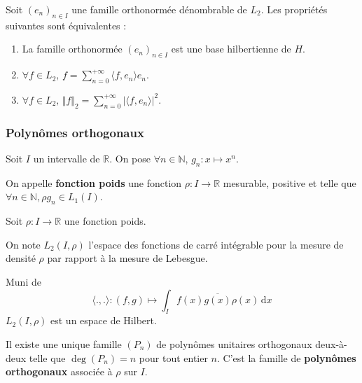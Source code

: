 	\begin{theorem}
		Soit $(e_n)_{n \in I}$ une famille orthonormée dénombrable de $L_2$. Les propriétés suivantes sont équivalentes :
		\begin{enumerate}[label=(\roman*)]
			\item La famille orthonormée $(e_n)_{n \in I}$ est une base hilbertienne de $H$.
			\item $\forall f \in L_2, \, f = \sum_{n=0}^{+\infty} \langle f, e_n \rangle e_n$.
			\item $\forall f \in L_2, \, \Vert f \Vert_2 = \sum_{n=0}^{+\infty} \vert \langle f, e_n \rangle \vert^2$.
		\end{enumerate}
	\end{theorem}

	\subsubsection{Polynômes orthogonaux}

	\reference{110}

	Soit $I$ un intervalle de $\mathbb{R}$. On pose $\forall n \in \mathbb{N}$, $g_n : x \mapsto x^n$.

	\begin{definition}
		On appelle \textbf{fonction poids} une fonction $\rho : I \rightarrow \mathbb{R}$ mesurable, positive et telle que $\forall n \in \mathbb{N}, \rho g_n \in L_1(I)$.
	\end{definition}

	Soit $\rho : I \rightarrow \mathbb{R}$ une fonction poids.

	\begin{notation}
		On note $L_2(I, \rho)$ l'espace des fonctions de carré intégrable pour la mesure de densité $\rho$ par rapport à la mesure de Lebesgue.
	\end{notation}

	\begin{proposition}
		Muni de
		\[ \langle ., . \rangle : (f,g) \mapsto \int_I f(x) \overline{g(x)} \rho(x) \, \mathrm{d}x \]
		$L_2(I, \rho)$ est un espace de Hilbert.
	\end{proposition}

	\begin{theorem}
		Il existe une unique famille $(P_n)$ de polynômes unitaires orthogonaux deux-à-deux telle que $\deg(P_n) = n$ pour tout entier $n$. C'est la famille de \textbf{polynômes orthogonaux} associée à $\rho$ sur $I$.
	\end{theorem}

